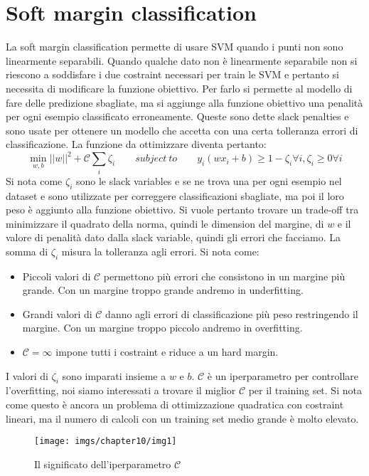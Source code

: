 \section{Soft margin classification}
La soft margin classification permette di usare SVM quando i punti non sono linearmente separabili.
Quando qualche dato non \`e linearmente separabile non si riescono a soddisfare i due costraint necessari per train le SVM e pertanto si necessita di modificare la funzione obiettivo.
Per farlo si permette al modello di fare delle predizione sbagliate, ma si aggiunge alla funzione obiettivo una penalit\`a per ogni esempio classificato erroneamente.
Queste sono dette slack penalties e sono usate per ottenere un modello che accetta con una certa tolleranza errori di classificazione.
La funzione da ottimizzare diventa pertanto:
$$\min_{w,b}||w||^2+\mathcal{C}\sum_i\zeta_i\qquad subject\ to\qquad y_i(wx_i+b)\ge 1 -\zeta_i\forall i, \zeta_i \ge 0 \forall i$$
Si nota come $\zeta_i$ sono le slack variables e se ne trova una per ogni esempio nel dataset e sono utilizzate per correggere classificazioni sbagliate, ma poi il loro peso \`e aggiunto alla funzione obiettivo.
Si vuole pertanto trovare un trade-off tra minimizzare il quadrato della norma, quindi le dimension del margine, di $w$ e il valore di penalit\`a dato dalla slack variable, quindi gli errori che facciamo.
La somma di $\zeta_i$ misura la tolleranza agli errori.
Si nota come:
\begin{multicols}{2}
	\begin{itemize}
		\item Piccoli valori di $\mathcal{C}$ permettono pi\`u errori che consistono in un margine pi\`u grande. 
		Con un margine troppo grande andremo in underfitting.
		\item Grandi valori di $\mathcal{C}$ danno agli errori di classificazione pi\`u peso restringendo il margine. 
		Con un margine troppo piccolo andremo in overfitting.
		\item $\mathcal{C} = \infty$ impone tutti i costraint e riduce a un hard margin.
	\end{itemize}
\end{multicols}
I valori di $\zeta_i$ sono imparati insieme a $w$ e $b$.
$\mathcal{C}$ \`e un iperparametro per controllare l'overfitting, noi siamo interessati a trovare il miglior $\mathcal{C}$ per il training set.
Si nota come questo \`e ancora un problema di ottimizzazione quadratica con costraint lineari, ma il numero di calcoli con un training set medio grande \`e molto elevato.
\begin{figure}
	\centering
	\texttt{[image: imgs/chapter10/img1]}
	\caption{Il significato dell'iperparametro $\mathcal{C}$}
	\label{fig:chapter10-01}
\end{figure}

